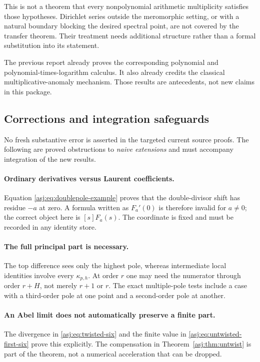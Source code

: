 \documentclass[11pt]{article}
\numberwithin{equation}{section}
\theoremstyle{definition}\newtheorem{definition}[theorem]{Definition}
\theoremstyle{remark}\newtheorem{remark}[theorem]{Remark}\newtheorem{example}[theorem]{Example}
\begin{document}
This is not a theorem that every nonpolynomial arithmetic multiplicity
satisfies those hypotheses. Dirichlet series outside the meromorphic
setting, or with a natural boundary blocking the desired spectral point,
are not covered by the transfer theorem. Their treatment needs additional
structure rather than a formal substitution into its statement.

The previous report already proves the corresponding polynomial and
polynomial-times-logarithm calculus. It also already credits the classical
multiplicative-anomaly mechanism. Those results are antecedents, not new
claims in this package.

\subsection{Corrections and integration safeguards}
No fresh substantive error is asserted in the targeted current source
proofs. The following are proved obstructions to \emph{naive extensions}
and must accompany integration of the new results.

\paragraph{Ordinary derivatives versus Laurent coefficients.}
Equation \eqref{asj:eq:doublepole-example} proves that the double-divisor
shift has residue $-a$ at zero. A formula written as $F_a'(0)$ is
therefore invalid for $a\ne0$; the correct object here is $[s]F_a(s)$.
The coordinate is fixed and must be recorded in any identity store.

\paragraph{The full principal part is necessary.}
The top difference sees only the highest pole, whereas intermediate
local identities involve every $\kappa_{p,h}$. At order $r$ one may
need the numerator through order $r+H$, not merely $r+1$ or $r$.
The exact multiple-pole tests include a case with a third-order pole
at one point and a second-order pole at another.

\paragraph{An Abel limit does not automatically preserve a finite part.}
The divergence in \eqref{asj:eq:twisted-six} and the finite value in
\eqref{asj:eq:untwisted-first-six} prove this explicitly. The compensation
in Theorem~\ref{asj:thm:untwist} is part of the theorem, not a numerical
acceleration that can be dropped.
\end{document}
